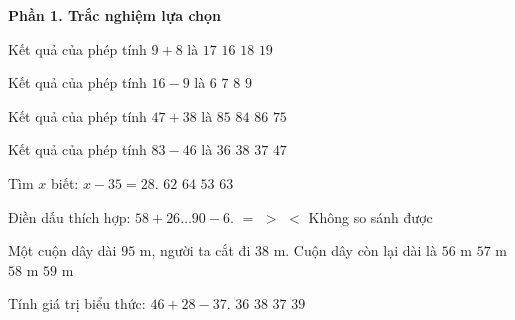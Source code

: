 \textbf{Phần 1. Trắc nghiệm lựa chọn}

\begin{ex} %
Kết quả của phép tính $9 + 8$ là
\choice
{\True $17$}
{$16$}
{$18$}
{$19$}
\end{ex}

\begin{ex} %
Kết quả của phép tính $16 - 9$ là
\choice
{$6$}
{\True $7$}
{$8$}
{$9$}
\end{ex}

\begin{ex} %
Kết quả của phép tính $47 + 38$ là
\choice
{\True $85$}
{$84$}
{$86$}
{$75$}
\end{ex}

\begin{ex} %
Kết quả của phép tính $83 - 46$ là
\choice
{$36$}
{$38$}
{\True $37$}
{$47$}
\end{ex}

\begin{ex} %
Tìm $x$ biết: $x - 35 = 28$.
\choice
{$62$}
{$64$}
{$53$}
{\True $63$}
\end{ex}

\begin{ex} %
Điền dấu thích hợp: $58 + 26 \dots 90 - 6$.
\choice
{\True $=$}
{$>$}
{$<$}
{Không so sánh được}
\end{ex}

\begin{ex} %
Một cuộn dây dài $95\text{ m}$, người ta cắt đi $38\text{ m}$. Cuộn dây còn lại dài là
\choice
{$56\text{ m}$}
{\True $57\text{ m}$}
{$58\text{ m}$}
{$59\text{ m}$}
\end{ex}

\begin{ex} %
Tính giá trị biểu thức: $46 + 28 - 37$.
\choice
{$36$}
{$38$}
{\True $37$}
{$39$}
\end{ex}

